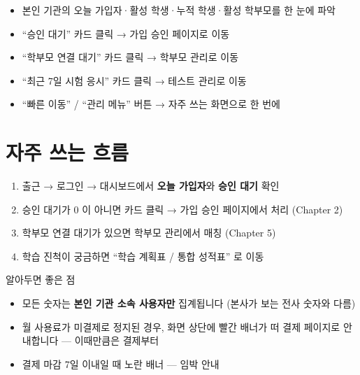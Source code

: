 \begin{itemize}[leftmargin=1.2em]
  \item 본인 기관의 오늘 가입자·활성 학생·누적 학생·활성 학부모를 한 눈에 파악
  \item ``승인 대기'' 카드 클릭 → 가입 승인 페이지로 이동
  \item ``학부모 연결 대기'' 카드 클릭 → 학부모 관리로 이동
  \item ``최근 7일 시험 응시'' 카드 클릭 → 테스트 관리로 이동
  \item ``빠른 이동'' / ``관리 메뉴'' 버튼 → 자주 쓰는 화면으로 한 번에
\end{itemize}

\section*{자주 쓰는 흐름}

\begin{enumerate}
  \item 출근 → 로그인 → 대시보드에서 \textbf{오늘 가입자}와 \textbf{승인 대기} 확인
  \item 승인 대기가 0 이 아니면 카드 클릭 → 가입 승인 페이지에서 처리 (Chapter 2)
  \item 학부모 연결 대기가 있으면 학부모 관리에서 매칭 (Chapter 5)
  \item 학습 진척이 궁금하면 ``학습 계획표 / 통합 성적표'' 로 이동
\end{enumerate}

\begin{tipbox}{알아두면 좋은 점}
\begin{itemize}[leftmargin=1.2em]
  \item 모든 숫자는 \textbf{본인 기관 소속 사용자만} 집계됩니다 (본사가 보는 전사 숫자와 다름)
  \item 월 사용료가 미결제로 정지된 경우, 화면 상단에 빨간 배너가 떠 결제 페이지로 안내합니다 — 이때만큼은 결제부터
  \item 결제 마감 7일 이내일 때 노란 배너 — 임박 안내
\end{itemize}
\end{tipbox}

